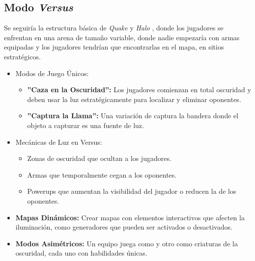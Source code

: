     \subsection{Modo \textit{Versus}} \label{versus}
        Se seguiría la estructura básica de \textit{Quake} y \textit{Halo} \cite{halo2001}, donde los jugadores se enfrentan en una arena de tamaño variable, donde nadie empezaría con armas equipadas y los jugadores tendrían que encontrarlas en el mapa, en sitios estratégicos.
        \begin{itemize}
            \item Modos de Juego Únicos:
            \begin{itemize}
                \item \textbf{''Caza en la Oscuridad'':} Los jugadores comienzan en total oscuridad y deben usar la luz estratégicamente para localizar y eliminar oponentes.
                \item \textbf{''Captura la Llama'':} Una variación de captura la bandera donde el objeto a capturar es una fuente de luz.
            \end{itemize}

            \item Mecánicas de Luz en Versus:
            \begin{itemize}
                \item Zonas de oscuridad que ocultan a los jugadores.
                \item Armas que temporalmente cegan a los oponentes.
                \item Powerups que aumentan la visibilidad del jugador o reducen la de los oponentes.
            \end{itemize}
            \item \textbf{Mapas Dinámicos:} Crear mapas con elementos interactivos que afecten la iluminación, como generadores que pueden ser activados o desactivados.
            \item \textbf{Modos Asimétricos: }Un equipo juega como \hunters y otro como criaturas de la oscuridad, cada uno con habilidades únicas.
        \end{itemize}
